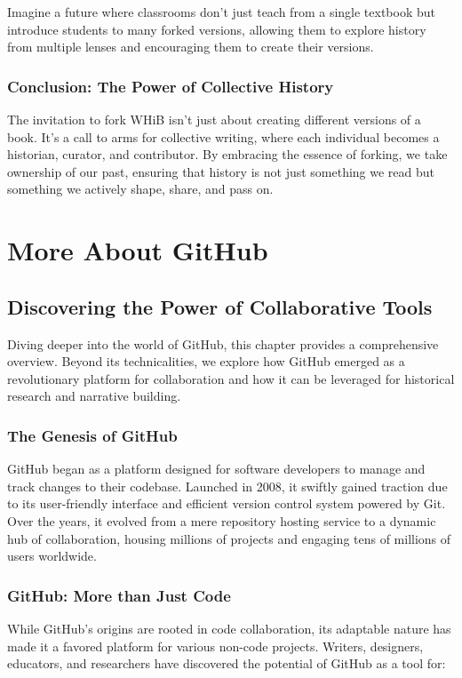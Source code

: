 \documentclass{book}
\begin{document}
Imagine a future where classrooms don't just teach from a single textbook but introduce students to many forked versions, allowing them to explore history from multiple lenses and encouraging them to create their versions.

\subsection*{Conclusion: The Power of Collective History}

The invitation to fork WHiB isn't just about creating different versions of a book. It's a call to arms for collective writing, where each individual becomes a historian, curator, and contributor. By embracing the essence of forking, we take ownership of our past, ensuring that history is not just something we read but something we actively shape, share, and pass on.

\chapter{More About GitHub}
\section*{Discovering the Power of Collaborative Tools}
Diving deeper into the world of GitHub, this chapter provides a comprehensive overview. Beyond its technicalities, we explore how GitHub emerged as a revolutionary platform for collaboration and how it can be leveraged for historical research and narrative building.

\subsection*{The Genesis of GitHub}
GitHub began as a platform designed for software developers to manage and track changes to their codebase. Launched in 2008, it swiftly gained traction due to its user-friendly interface and efficient version control system powered by Git. Over the years, it evolved from a mere repository hosting service to a dynamic hub of collaboration, housing millions of projects and engaging tens of millions of users worldwide.

\subsection*{GitHub: More than Just Code}
While GitHub's origins are rooted in code collaboration, its adaptable nature has made it a favored platform for various non-code projects. Writers, designers, educators, and researchers have discovered the potential of GitHub as a tool for:
\end{document}
